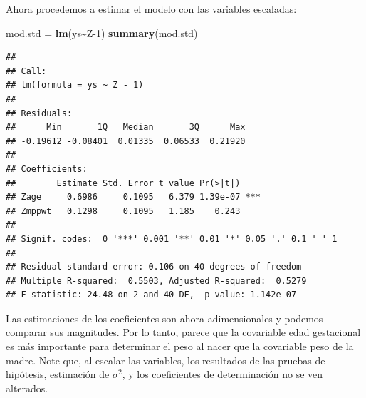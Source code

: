 \documentclass[
]{article}
\newenvironment{Shaded}{\begin{snugshade}}{\end{snugshade}}
\newcommand{\ControlFlowTok}[1]{\textcolor[rgb]{0.13,0.29,0.53}{\textbf{#1}}}
\newcommand{\DecValTok}[1]{\textcolor[rgb]{0.00,0.00,0.81}{#1}}
\newcommand{\FunctionTok}[1]{\textcolor[rgb]{0.13,0.29,0.53}{\textbf{#1}}}
\newcommand{\NormalTok}[1]{#1}
\newcommand{\OtherTok}[1]{\textcolor[rgb]{0.56,0.35,0.01}{#1}}
\newcommand{\SpecialCharTok}[1]{\textcolor[rgb]{0.81,0.36,0.00}{\textbf{#1}}}
\begin{document}
\begin{Shaded}
\end{Shaded}

Ahora procedemos a estimar el modelo con las variables escaladas:

\begin{Shaded}
\begin{Highlighting}[]
\NormalTok{mod.std }\OtherTok{=} \FunctionTok{lm}\NormalTok{(ys}\SpecialCharTok{\textasciitilde{}}\NormalTok{Z}\DecValTok{{-}1}\NormalTok{)}
\FunctionTok{summary}\NormalTok{(mod.std)}
\end{Highlighting}
\end{Shaded}

\begin{verbatim}
## 
## Call:
## lm(formula = ys ~ Z - 1)
## 
## Residuals:
##      Min       1Q   Median       3Q      Max 
## -0.19612 -0.08401  0.01335  0.06533  0.21920 
## 
## Coefficients:
##        Estimate Std. Error t value Pr(>|t|)    
## Zage     0.6986     0.1095   6.379 1.39e-07 ***
## Zmppwt   0.1298     0.1095   1.185    0.243    
## ---
## Signif. codes:  0 '***' 0.001 '**' 0.01 '*' 0.05 '.' 0.1 ' ' 1
## 
## Residual standard error: 0.106 on 40 degrees of freedom
## Multiple R-squared:  0.5503, Adjusted R-squared:  0.5279 
## F-statistic: 24.48 on 2 and 40 DF,  p-value: 1.142e-07
\end{verbatim}

Las estimaciones de los coeficientes son ahora adimensionales y podemos comparar sus magnitudes. Por lo tanto, parece que la covariable edad gestacional es más importante para determinar el peso al nacer que la covariable peso de la madre. Note que, al escalar las variables, los resultados de las pruebas de hipótesis, estimación de \(\sigma^{2}\), y los coeficientes de determinación no se ven alterados.
\end{document}
